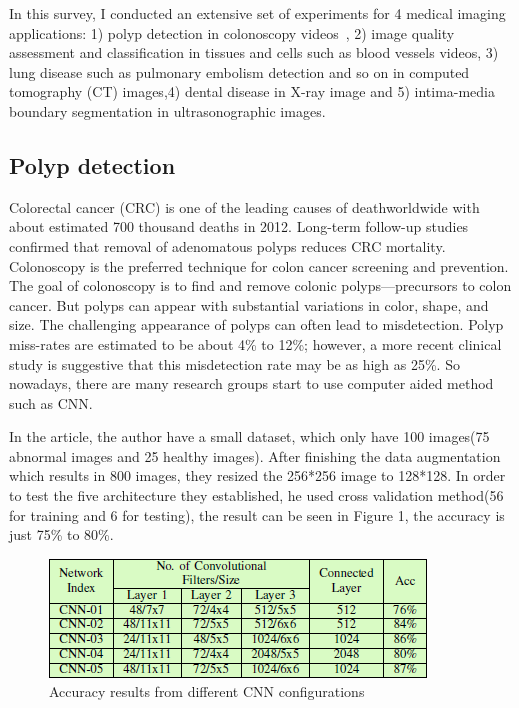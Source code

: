 \documentclass[10pt,twocolumn,letterpaper]{article}
\begin{document}
In this survey, I conducted an extensive set of experiments for 4 medical imaging applications: 1) polyp detection in colonoscopy videos~\cite{ribeiro2016colonic}\cite{zhang2017automatic}, 2) image quality assessment and classification in tissues and cells such as blood vessels videos\cite{mcilroy2017vivo}\cite{li2017cell}\cite{huang2017epithelium}\cite{kieffer2017convolutional}\cite{hadad2017classification}\cite{araujo2017classification}, 3) lung disease such as pulmonary embolism detection and so on in computed tomography (CT) images\cite{shen2015multi}\cite{li2014medical},4) dental disease in X-ray image\cite{prajapaticlassification} and 5) intima-media boundary segmentation in ultrasonographic images\cite{roth2015anatomy}.

\subsection{Polyp detection}

Colorectal cancer (CRC) is one of the leading causes of deathworldwide with about estimated 700 thousand deaths in 2012\cite{zhang2017automatic}. Long-term follow-up studies confirmed that removal of adenomatous polyps reduces CRC mortality. Colonoscopy is the preferred technique for colon cancer screening and prevention. The goal of colonoscopy is to find and remove colonic polyps—precursors to colon cancer. But polyps can appear with substantial variations in color, shape, and size. The challenging appearance of polyps can often lead to misdetection\cite{ribeiro2016colonic}. Polyp miss-rates are estimated to be about 4\% to 12\%; however, a more recent clinical study is suggestive that this misdetection rate may be as high as 25\%. So nowadays, there are many research groups start to use computer aided method such as CNN.

In the article\cite{ribeiro2016colonic}, the author have a small dataset, which only have 100 images(75 abnormal images and 25 healthy images). After finishing the data augmentation which results in 800 images, they resized the 256*256 image to 128*128. In order to test the five architecture they established, he used cross validation method(56 for training and 6 for testing), the result can be seen in Figure 1, the accuracy is just 75\% to 80\%.

\begin{figure}[t]
	\begin{center}
		\includegraphics[width=0.8\linewidth]{4}
	\end{center}
	\caption{Accuracy results from different CNN configurations} 
	\label{fig:long}
	\label{fig:onecol}
\end{figure}
\end{document}
